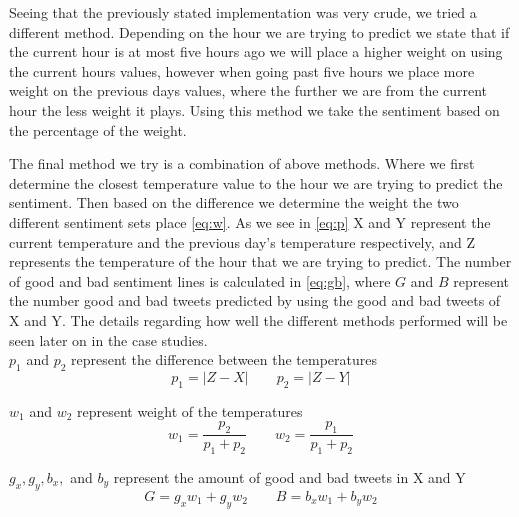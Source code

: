 Seeing that the previously stated implementation was very crude, we tried a different method. Depending on the hour we are trying to predict we state that if the current hour is at most five hours ago we will place a higher weight on using the current hours values, however when going past five hours we place more weight on the previous days values, where the further we are from the current hour the less weight it plays. Using this method we take the sentiment based on the percentage of the weight.

The final method we try is a combination of above methods. Where we first determine the closest temperature value to the hour we are trying to predict the sentiment. Then based on the difference we determine the weight the two different sentiment sets place \eqref{eq:w}. As we see in \eqref{eq:p} X and Y represent the current temperature and the previous day's temperature respectively, and Z represents the temperature of the hour that we are trying to predict. The number of good and bad sentiment lines is calculated in \eqref{eq:gb}, where $G$ and $B$ represent the number good and bad tweets predicted by using the good and bad tweets of X and Y. The details regarding how well the different methods performed will be seen later on in the case studies.\\

$p_1$ and $p_2$ represent the difference between the temperatures
\begin{equation} \label{eq:p} p_{1}=\left | Z-X \right |	\qquad p_{2}=\left | Z-Y \right |	 \end{equation}

$w_1$ and $w_2$ represent weight of the temperatures
\begin{equation} \label{eq:w} w_{1}=\frac{p_{2}}{p_{1}+p_{2}} 	\qquad w_{2}=\frac{p_{1}}{p_{1}+p_{2}}   \end{equation}

$g_x, g_y, b_x,$ and $b_y$ represent the amount of good and bad tweets in X and Y
\begin{equation} \label{eq:gb}  G = g_{x}w_{1} + g_{y}w_{2}	\qquad B = b_{x}w_{1} + b_{y}w_{2}	 \end{equation}


